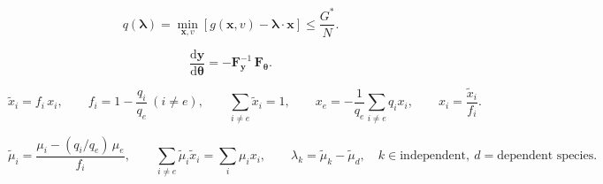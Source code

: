 \documentclass[11pt]{article}
\begin{document}
\begin{equation}
q(\boldsymbol\lambda)=\min_{\boldsymbol x,v}\left[g(\boldsymbol x,v)-\boldsymbol\lambda\cdot\boldsymbol x\right]\le\frac{G^{*}}{N}.
\label{eq:dual_inner_problem}
\end{equation}

\begin{equation}
\frac{\mathrm d\boldsymbol y}{\mathrm d\boldsymbol\theta}=-\mathbf{F}_{\boldsymbol y}^{-1}\,\mathbf{F}_{\boldsymbol\theta}.
\label{eq:implicit_sensitivity}
\end{equation}

\begin{equation}
\tilde{x}_i = f_i\,x_i,\qquad f_i = 1 - \frac{q_i}{q_e}\ (i \neq e),\qquad \sum_{i \neq e}\tilde{x}_i = 1,\qquad x_e = -\frac{1}{q_e}\sum_{i \neq e} q_i x_i,\qquad x_i = \frac{\tilde{x}_i}{f_i}.
\label{eq:modified_fraction_chart}
\end{equation}

\begin{equation}
\tilde{\mu}_i = \frac{\mu_i - (q_i/q_e)\,\mu_e}{f_i},\qquad \sum_{i \neq e}\tilde{\mu}_i\tilde{x}_i = \sum_i \mu_i x_i,\qquad \lambda_k = \tilde{\mu}_k - \tilde{\mu}_{d},\quad k \in \text{independent},\ d = \text{dependent species}.
\label{eq:multiplier_potential_link}
\end{equation}
\end{document}
